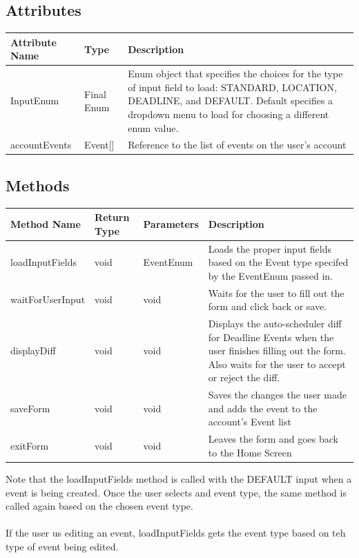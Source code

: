 \documentclass{scrreprt}
\begin{document}
\subsection{Attributes}

\begin{center}
\begin{longtable}{ | p{3cm} | p{3cm} | p{9cm} | }
\hline
\textbf{Attribute Name} & \textbf{Type} & \textbf{Description} \\
\hline
InputEnum & Final Enum & Enum object that specifies the choices for the type of input field to load: STANDARD, LOCATION, DEADLINE, and DEFAULT.  Default specifies a dropdown menu to load for choosing a different enum value. \\
\hline
accountEvents & Event[] & Reference to the list of events on the user's account \\
\hline
\end{longtable}
\end{center}

\subsection{Methods}

\begin{center}
\begin{longtable}{ | p{3cm} | p{1cm} | p{2cm} | p{9cm} | }
\hline
\textbf{Method Name} & \textbf{Return Type} & \textbf{Parameters} & \textbf{Description} \\
\hline
loadInputFields & void & EventEnum & Loads the proper input fields based on the Event type specifed by the EventEnum passed in.\\
\hline
waitForUserInput & void & void & Waits for the user to fill out the form and click back or save. \\
\hline
displayDiff & void & void & Displays the auto-scheduler diff for Deadline Events when the user finishes filling out the form. Also waits for the user to accept or reject the diff. \\
\hline
saveForm & void & void & Saves the changes the user made and adds the event to the account's Event list \\
\hline
exitForm & void & void & Leaves the form and goes back to the Home Screen \\
\hline
\end{longtable}
\end{center}

Note that the loadInputFields method is called with the DEFAULT input when a event is being created. Once the user selects and event type, the same method is called again based on the chosen event type.\\\\
If the user us editing an event, loadInputFields gets the event type based on teh type of event being edited.\\\\
\end{document}
